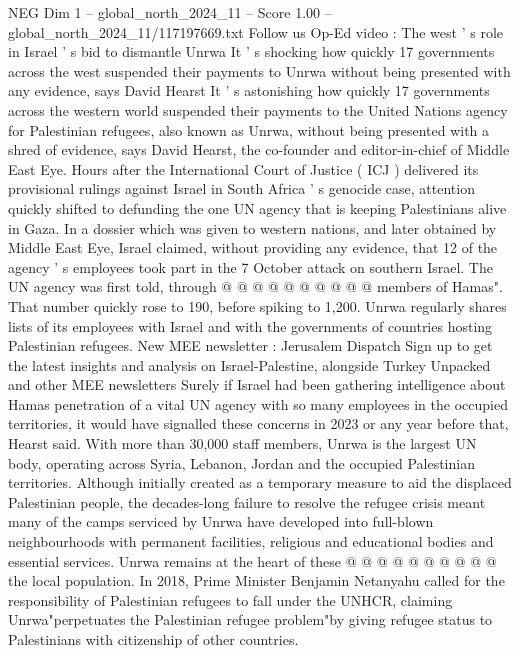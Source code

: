 \begin{textsample}{NEG Dim 1 – global\_north\_2024\_11 – Score 1.00 – global\_north\_2024\_11/117197669.txt}  \label{ex:f1_neg_222}
Follow us Op-Ed video : The west ' s role in Israel ' s bid to dismantle Unrwa It ' s shocking how quickly 17 governments across the west suspended their payments to Unrwa without being presented with any evidence, says David Hearst It ' s astonishing how quickly 17 governments across the western world suspended their payments to the United Nations agency for Palestinian refugees, also known as Unrwa, without being presented with a shred of evidence, says David Hearst, the co-founder and editor-in-chief of Middle East Eye.
Hours after the International Court of Justice ( ICJ ) delivered its provisional rulings against Israel in South Africa ' s genocide case, attention quickly shifted to defunding the one UN agency that is keeping Palestinians alive in Gaza.
In a dossier which was given to western nations, and later obtained by Middle East Eye, Israel claimed, without providing any evidence, that 12 of the agency ' s employees took part in the 7 October attack on southern Israel.
The UN agency was first told, through @ @ @ @ @ @ @ @ @ @ members of Hamas".
That number quickly rose to 190, before spiking to 1,200.
Unrwa regularly shares lists of its employees with Israel and with the governments of countries hosting Palestinian refugees.
New MEE newsletter : Jerusalem Dispatch Sign up to get the latest insights and analysis on Israel-Palestine, alongside Turkey Unpacked and other MEE newsletters Surely if Israel had been gathering intelligence about Hamas penetration of a vital UN agency with so many employees in the occupied territories, it would have signalled these concerns in 2023 or any year before that, Hearst said.
With more than 30,000 staff members, Unrwa is the largest UN body, operating across Syria, Lebanon, Jordan and the occupied Palestinian territories.
Although initially created as a temporary measure to aid the displaced Palestinian people, the decades-long failure to resolve the refugee crisis meant many of the camps serviced by Unrwa have developed into full-blown neighbourhoods with permanent facilities, religious and educational bodies and essential services.
Unrwa remains at the heart of these @ @ @ @ @ @ @ @ @ @ the local population.
In 2018, Prime Minister Benjamin Netanyahu called for the responsibility of Palestinian refugees to fall under the UNHCR, claiming Unrwa"perpetuates the Palestinian refugee problem"by giving refugee status to Palestinians with citizenship of other countries.

\end{textsample}
